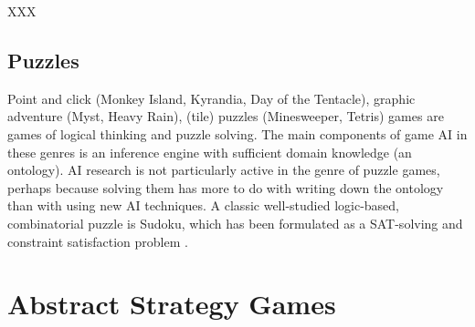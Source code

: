 XXX

\subsection{Puzzles}
Point and click (Monkey Island, Kyrandia, Day of the Tentacle), graphic adventure (Myst, Heavy Rain), (tile) puzzles (Minesweeper, Tetris) games are games of logical thinking and puzzle solving. The main components of game AI in these genres is an inference engine with sufficient domain knowledge (an ontology). AI research is not particularly active in the genre of puzzle games, perhaps because solving them has more to do with writing down the ontology than with using new AI techniques. A classic well-studied logic-based, combinatorial puzzle is Sudoku, which has been formulated as a SAT-solving \citep{lynce2006sudoku} and constraint satisfaction problem \citep{Simonis2005}.


\section{Abstract Strategy Games}
